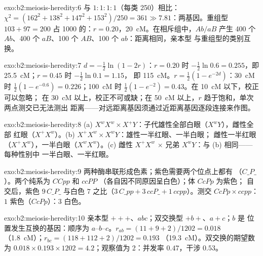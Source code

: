\begin{solution}{exo:b2:meiosis-heredity:6}
与 $1 : 1 : 1 : 1$（每类 250）相比：$\chi^2 = (162^2 + 138^2 + 147^2
+ 153^2)/250 = 361 \gg 7.81$：两基因。重组型 $103 + 97 = 200$
占 1000 的：$r = 0.20$，\qty{20}{cM}。在相斥组中，$Ab/aB$ 产生 400
个 $Ab$、400 个 $aB$、100 个 $AB$、100 个 $ab$：距离相同，亲本型
与重组型的类别互换。
\end{solution}

\begin{solution}{exo:b2:meiosis-heredity:7}
$d = -\tfrac12\ln(1 - 2r)$：$r = 0.20$ 时 $-\tfrac12\ln 0.6 =
0.255$，即 \qty{25.5}{cM}；$r = 0.45$ 时 $-\tfrac12\ln 0.1 = 1.15$，
即 \qty{115}{cM}。$r = \tfrac12(1 - e^{-2d})$：\qty{30}{cM} 时
$\tfrac12(1 - e^{-0.6}) = 0.226$；\qty{100}{cM} 时 $\tfrac12(1 -
e^{-2}) = 0.43$。在 \qty{10}{cM} 以下，校正可以忽略；
在 \qty{30}{cM} 以上，校正不可或缺；在 \qty{50}{cM} 以上，$r$
趋于饱和，单次两点测交已无法测出
距离——对远距离基因须通过近距离基因逐段连接来作图。
\end{solution}

\begin{solution}{exo:b2:meiosis-heredity:8}
(a) $X^wX^w \times X^+Y$：子代雄性全部白眼（$X^wY$），雌性全部
红眼（$X^+X^w$）。(b) $X^+X^w \times X^wY$：雄性一半红眼、一半白眼；
雌性一半红眼（$X^+X^w$），一半白眼（$X^wX^w$）。(c) 雌性
$X^+X^w$ $\times$ 兄弟 $X^wY$：与 (b) 相同——每种性别中
一半白眼、一半红眼。
\end{solution}

\begin{solution}{exo:b2:meiosis-heredity:9}
两种酶串联形成色素；紫色需要两个位点上都有
（$C\_P\_$）。两个纯系为 $CCpp$ 和 $ccPP$
（各自因不同原因呈白色）；体 $CcPp$ 为紫色；
自交后，紫色 $9\,C\_P\_$ 与白色 $7$ 之比（$3\,C\_pp + 3\,ccP\_ +
1\,ccpp$）。测交 $CcPp\times ccpp$：$1$ 紫色（$CcPp$）：$3$
白色。
\end{solution}

\begin{solution}{exo:b2:meiosis-heredity:10}
亲本型 $+++$、$abc$；双交换型 $+b+$、$a+c$；$b$ 是
位置发生互换的基因：顺序为 $a$--$b$--$c$。$r_{ab} = (11 + 9 + 2)/1202
= 0.018$（\qty{1.8}{cM}）；$r_{bc} = (118 + 112 + 2)/1202 = 0.193$
（\qty{19.3}{cM}）。双交换的期望数为 $0.018\times 0.193\times 1202 =
4.2$；观察值为 2：并发率 $0.47$，干涉 $0.53$。
\end{solution}

